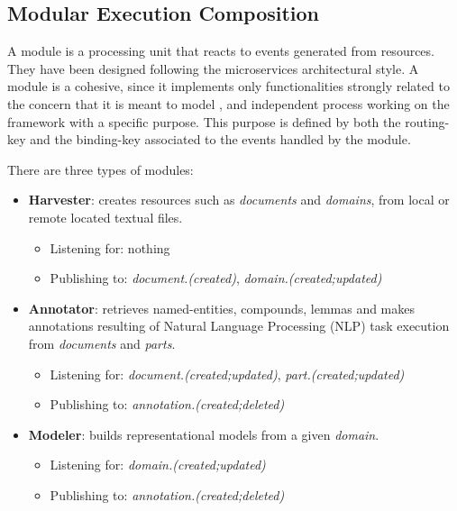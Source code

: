\subsection{Modular Execution Composition}

A module is a processing unit that reacts to events generated from resources. They have been designed following the microservices architectural style. A module is a cohesive, since it implements only functionalities strongly related to the concern that it is meant to model \cite{Dragoni2016}, and independent process working on the framework with a specific purpose. This purpose is defined by both the routing-key and the binding-key associated to the events handled by the module. 

There are three types of modules:
\begin{itemize}
	\item \textbf{Harvester}: creates resources such as \textit{documents} and \textit{domains}, from local or remote located textual files.
    \begin{itemize}[rightmargin=\dimexpr\linewidth-5cm-\leftmargin\relax]
    		\item Listening for: nothing
		\item Publishing to: \textit{document.(created)}, \textit{domain.(created;updated)}
    \end{itemize}
    \item \textbf{Annotator}: retrieves named-entities, compounds, lemmas and makes annotations resulting of Natural Language Processing (NLP) task execution from \textit{documents} and \textit{parts}.
    \begin{itemize}[rightmargin=\dimexpr\linewidth-5cm-\leftmargin\relax]
    	\item Listening for: \textit{document.(created;updated)}, \textit{part.(created;updated)}
		\item Publishing to: \textit{annotation.(created;deleted)}
    \end{itemize}
    \item \textbf{Modeler}: builds representational models from a given \textit{domain}. 
    \begin{itemize}[rightmargin=\dimexpr\linewidth-5cm-\leftmargin\relax]
    	\item Listening for: \textit{domain.(created;updated)}
		\item Publishing to: \textit{annotation.(created;deleted)}
    \end{itemize}
\end{itemize}

